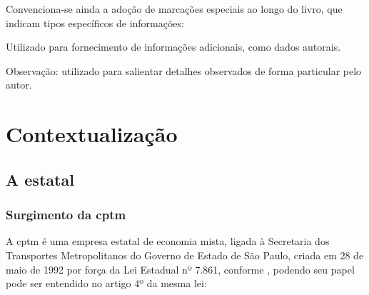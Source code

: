 \documentclass[11pt,fleqn]{book} %
\begin{document}
Convenciona-se ainda a adoção de marcações especiais ao longo do livro, que indicam tipos específicos de informações:

\begin{info}
	Utilizado para fornecimento de informações adicionais, como dados autorais.
\end{info}

\begin{obs}
	Observação: utilizado para salientar detalhes observados de forma particular pelo autor.
\end{obs}


\part{Contextualização}

\chapter{A estatal}

\section{Surgimento da \gls{cptm}}

A \glsdesc*{cptm} é uma empresa estatal de economia mista, ligada à Secretaria dos Transportes Metropolitanos do Governo de Estado de São Paulo, criada em 28 de maio de 1992 por força da Lei Estadual nº 7.861, conforme \cite{sitecptm1}, podendo seu papel pode ser entendido no artigo 4º da mesma lei:
	
\end{document}
